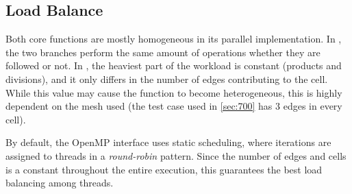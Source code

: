 \subsection{Load Balance}
\label{subsec:omp:load}

Both core functions are mostly homogeneous in its parallel implementation. In \computeflux, the two branches perform the same amount of operations whether they are followed or not. In \update, the heaviest part of the workload is constant (products and divisions), and it only differs in the number of edges contributing to the cell. While this value may cause the function to become heterogeneous, this is highly dependent on the mesh used (the test case used in \cref{sec:700} has 3 edges in every cell).

By default, the OpenMP interface uses static scheduling, where iterations are assigned to threads in a \textit{round-robin} pattern. Since the number of edges and cells is a constant throughout the entire execution, this guarantees the best load balancing among threads.
